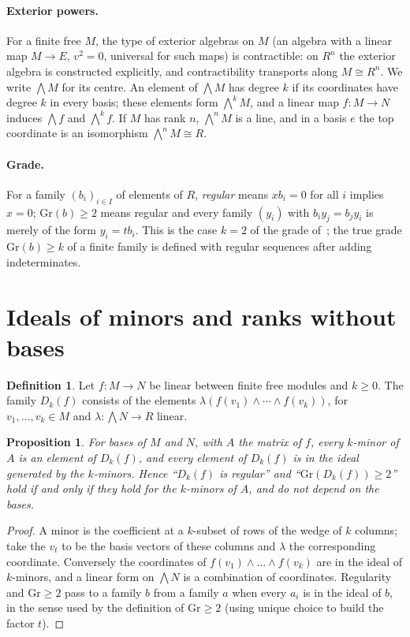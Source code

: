 \documentclass[11pt]{amsart}
\newtheorem{proposition}[theorem]{Proposition}
\theoremstyle{definition}
\newtheorem{definition}[theorem]{Definition}
\theoremstyle{remark}
\newcommand{\Gr}{\mathrm{Gr}}
\newcommand{\Ex}{{\textstyle\bigwedge}}
\begin{document}
\paragraph{Exterior powers.}  For a finite free $M$, the type of exterior
algebras on $M$ (an algebra with a linear map $M\to E$, $v^2=0$,
universal for such maps) is contractible: on $R^n$ the exterior algebra
is constructed explicitly, and contractibility transports along $M\cong
R^n$.  We write $\Ex M$ for its centre.  An element of $\Ex M$ has degree
$k$ if its coordinates have degree $k$ in every basis; these elements form
$\Ex^kM$, and a linear map $f:M\to N$ induces $\Ex f$ and $\Ex^kf$.  If
$M$ has rank $n$, $\Ex^nM$ is a line, and in a basis $e$ the top
coordinate is an isomorphism $\Ex^nM\cong R$.

\paragraph{Grade.}  For a family $(b_i)_{i\in I}$ of elements of $R$,
\emph{regular} means $xb_i=0$ for all $i$ implies $x=0$; $\Gr(b)\geq2$
means regular and every family $(y_i)$ with $b_iy_j=b_jy_i$ is merely of
the form $y_i=tb_i$.  This is the case $k=2$ of the grade
of~\cite[Section~6]{CQ}; the true grade $\Gr(b)\geq k$ of a finite
family is defined with regular sequences after adding indeterminates.

\section{Ideals of minors and ranks without bases}

\begin{definition}
Let $f:M\to N$ be linear between finite free modules and $k\geq0$.  The
family $D_k(f)$ consists of the elements
$\lambda(f(v_1)\wedge\cdots\wedge f(v_k))$, for $v_1,\dots,v_k\in M$ and
$\lambda:\Ex N\to R$ linear.
\end{definition}

\begin{proposition}\label{prop:dk}
For bases of $M$ and $N$, with $A$ the matrix of $f$, every $k$-minor of
$A$ is an element of $D_k(f)$, and every element of $D_k(f)$ is in the
ideal generated by the $k$-minors.  Hence ``$D_k(f)$ is regular'' and
``$\Gr(D_k(f))\geq2$'' hold if and only if they hold for the $k$-minors
of $A$, and do not depend on the bases.
\end{proposition}

\begin{proof}
A minor is the coefficient at a $k$-subset of rows of the wedge of $k$
columns; take the $v_t$ to be the basis vectors of these columns and
$\lambda$ the corresponding coordinate.  Conversely the coordinates of
$f(v_1)\wedge\dots\wedge f(v_k)$ are in the ideal of $k$-minors, and a
linear form on $\Ex N$ is a combination of coordinates.  Regularity and
$\Gr\geq2$ pass to a family $b$ from a family $a$ when every $a_i$ is in
the ideal of $b$, in the sense used by the definition of $\Gr\geq2$
(using unique choice to build the factor $t$).
\end{proof}
\end{document}
